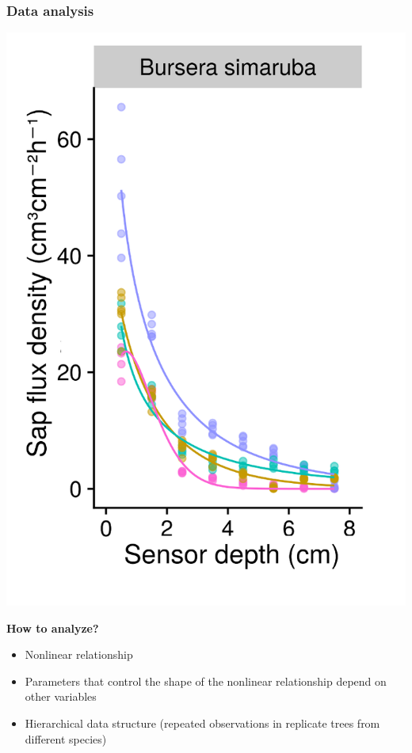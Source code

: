\documentclass[usepdftitle=false]{beamer}
\newcommand{\Blue}[1]{{\color{blue!50!black}\textbf{#1}}}
\newcommand{\tw}{\textwidth}
\begin{document}
\begin{frame}
	\frametitle{Data analysis}
	\begin{minipage}{0.38\tw}
		\includegraphics[width = \tw]{figures/HFD_05_profile_simarouba.png}
	\end{minipage}
	\begin{minipage}{0.6\tw}		
		   \Blue{How to analyze?}		
		\begin{itemize}[<+-| alert@+>]			
			\item Nonlinear relationship
			\item Parameters that control the shape of the nonlinear relationship depend on other variables
			\item Hierarchical data structure (repeated observations in replicate trees from different species)					
		\end{itemize}
	\end{minipage}
\end{frame}
\end{document}
